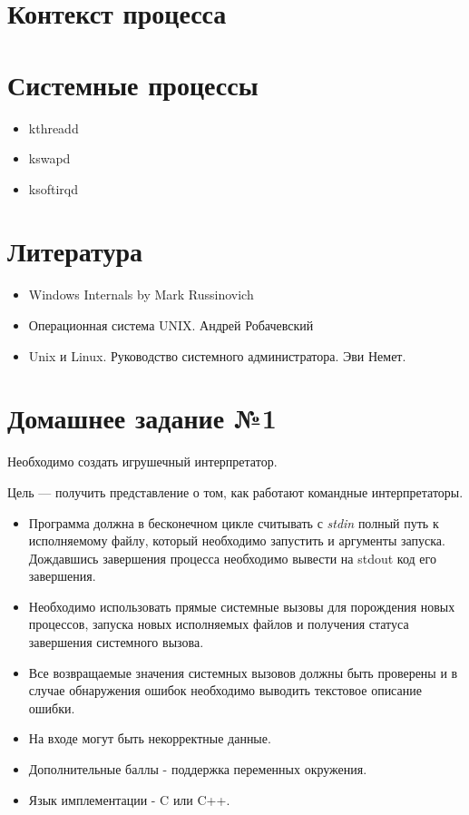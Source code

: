 \documentclass[../../lectures.tex]{subfiles}
\begin{document}
\section{Контекст процесса}
\todo{}

\section{Системные процессы}
\begin{itemize}
    \item kthreadd
    \item kswapd
    \item ksoftirqd
\end{itemize}
\section{Литература}
\begin{itemize}
    \item Windows Internals by Mark Russinovich
    \item Операционная система UNIX. Андрей Робачевский
    \item Unix и Linux. Руководство системного администратора. Эви Немет.
\end{itemize}

\section{Домашнее задание №1} 
Необходимо создать игрушечный интерпретатор.

Цель --- получить представление о том, как работают командные интерпретаторы.
\begin{itemize}
    \item Программа должна в бесконечном цикле считывать с \emph{stdin} полный путь к
          исполняемому файлу, который необходимо запустить и аргументы запуска.
          Дождавшись завершения процесса необходимо вывести на stdout код его завершения.

    \item Необходимо использовать прямые системные вызовы для порождения новых процессов,
          запуска новых исполняемых файлов и получения статуса завершения системного
          вызова.

    \item Все возвращаемые значения системных вызовов должны быть проверены и в случае
          обнаружения ошибок необходимо выводить текстовое описание ошибки.

    \item На входе могут быть некорректные данные.

    \item Дополнительные баллы - поддержка переменных окружения.

    \item Язык имплементации - C или C++.
\end{itemize}
\end{document}
